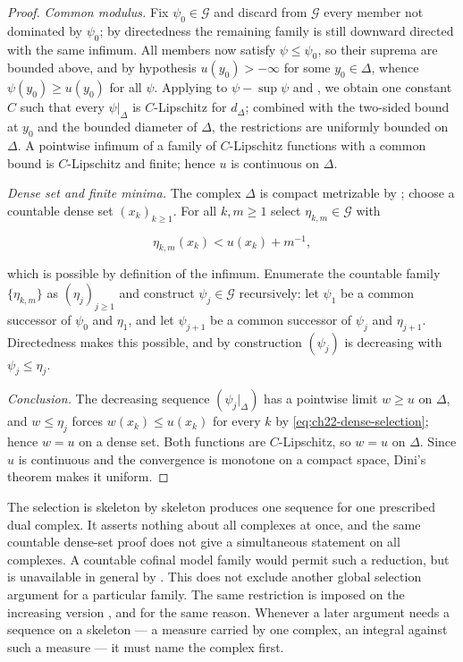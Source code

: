 \begin{proof}
\emph{Common modulus.}  Fix $\psi_0\in\mathcal G$ and discard from
$\mathcal G$ every member not dominated by $\psi_0$; by directedness the
remaining family is still downward directed with the same infimum.  All
members now satisfy $\psi\leq\psi_0$, so their suprema are bounded above,
and by hypothesis $u(y_0)>-\infty$ for some $y_0\in\Delta$, whence
$\psi(y_0)\geq u(y_0)$ for all $\psi$.  Applying
 to
$\psi-\sup\psi$ and , we obtain one
constant $C$ such that every $\psi|_\Delta$ is $C$-Lipschitz for
$d_\Delta$; combined with the two-sided bound at $y_0$ and the bounded
diameter of $\Delta$, the restrictions are uniformly bounded on
$\Delta$.  A pointwise infimum of a family of $C$-Lipschitz functions
with a common bound is $C$-Lipschitz and finite; hence $u$ is continuous
on $\Delta$.

\emph{Dense set and finite minima.}  The complex $\Delta$ is compact
metrizable by ; choose a countable dense set
$(x_k)_{k\geq1}$.  For all $k,m\geq1$ select
$\eta_{k,m}\in\mathcal G$ with

\[
                     \eta_{k,m}(x_k)<u(x_k)+m^{-1},
\tag{22.81}\label{eq:ch22-dense-selection}
\]

which is possible by definition of the infimum.  Enumerate the countable
family $\{\eta_{k,m}\}$ as $(\eta_j)_{j\geq1}$ and construct
$\psi_j\in\mathcal G$ recursively: let $\psi_1$ be a common successor of
$\psi_0$ and $\eta_1$, and let $\psi_{j+1}$ be a common successor of
$\psi_j$ and $\eta_{j+1}$.  Directedness makes this possible, and by
construction $(\psi_j)$ is decreasing with
$\psi_j\leq\eta_j$.

\emph{Conclusion.}  The decreasing sequence $(\psi_j|_\Delta)$ has a
pointwise limit $w\geq u$ on $\Delta$, and $w\leq\eta_j$ forces
$w(x_k)\leq u(x_k)$ for every $k$ by
\eqref{eq:ch22-dense-selection}; hence $w=u$ on a dense set.  Both
functions are $C$-Lipschitz, so $w=u$ on $\Delta$.  Since $u$ is
continuous and the convergence is monotone on a compact space, Dini's
theorem  makes it uniform.
\end{proof}

\begin{warning}{The selection is skeleton by skeleton}
 produces one sequence for one
prescribed dual complex.  It asserts nothing about all complexes at once,
and the same countable dense-set proof does not give a simultaneous
statement on all complexes.  A countable cofinal model family would permit
such a reduction, but is unavailable in general by
.  This does not exclude another
global selection argument for a particular family.  The same restriction is imposed on
the
increasing version , and for the
same reason.  Whenever a later argument needs a sequence on a skeleton --- a
measure carried by one complex, an integral against such a measure --- it
must name the complex first.
\end{warning}


